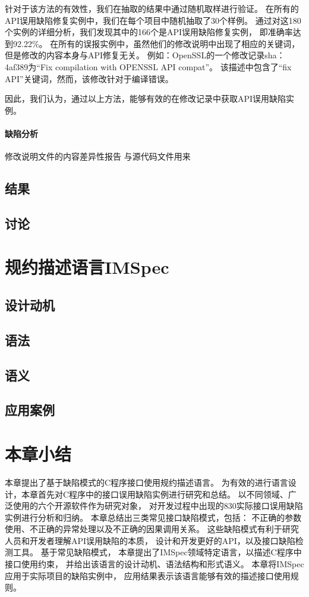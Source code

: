 针对于该方法的有效性，我们在抽取的结果中通过随机取样进行验证。
在所有的API误用缺陷修复实例中，我们在每个项目中随机抽取了30个样例。
通过对这180个实例的详细分析，我们发现其中的166个是API误用缺陷修复实例，
即准确率达到92.22\%。
在所有的误报实例中，虽然他们的修改说明中出现了相应的关键词，
但是修改的内容本身与API修复无关。
例如：OpenSSL的一个修改记录sha：4af389为“Fix compilation with OPENSSL API compat”。
该描述中包含了“fix API”关键词，然而，该修改针对于编译错误。

因此，我们认为，通过以上方法，能够有效的在修改记录中获取API误用缺陷实例。


\paragraph{缺陷分析}
修改说明文件的内容差异性报告
与源代码文件用来
\subsection{结果}

\subsection{讨论}

\section{规约描述语言IMSpec}
\label{sec:2.4}
\subsection{设计动机}
\subsection{语法}
\subsection{语义}
\subsection{应用案例}


\section{本章小结}
\label{sec:2.5}
本章提出了基于缺陷模式的C程序接口使用规约描述语言。
为有效的进行语言设计，本章首先对C程序中的接口误用缺陷实例进行研究和总结。
以不同领域、广泛使用的六个开源软件作为研究对象，
对开发过程中出现的830实际接口误用缺陷实例进行分析和归纳。
本章总结出三类常见接口缺陷模式，包括：
不正确的参数使用、不正确的异常处理以及不正确的因果调用关系。
这些缺陷模式有利于研究人员和开发者理解API误用缺陷的本质，
设计和开发更好的API，以及接口缺陷检测工具。
基于常见缺陷模式，
本章提出了IMSpec领域特定语言，以描述C程序中接口使用约束，
并给出该语言的设计动机、语法结构和形式语义。
本章将IMSpec应用于实际项目的缺陷实例中，
应用结果表示该语言能够有效的描述接口使用规则。